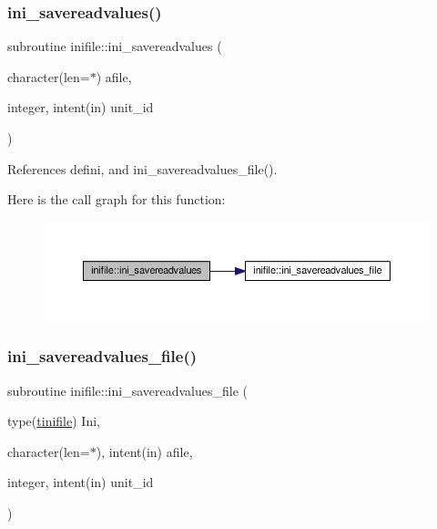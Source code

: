 \subsubsection{\texorpdfstring{ini\+\_\+savereadvalues()}{ini\_savereadvalues()}}
{\footnotesize\ttfamily subroutine inifile\+::ini\+\_\+savereadvalues (\begin{DoxyParamCaption}\item[{character(len=$\ast$)}]{afile,  }\item[{integer, intent(in)}]{unit\+\_\+id }\end{DoxyParamCaption})}



References defini, and ini\+\_\+savereadvalues\+\_\+file().

Here is the call graph for this function\+:
\nopagebreak
\begin{figure}[H]
\begin{center}
\leavevmode
\includegraphics[width=350pt]{namespaceinifile_a49bf986c5eea73c39bf9c4168143e81b_cgraph}
\end{center}
\end{figure}
\mbox{\label{namespaceinifile_a2e53433c13f03131abc980a06455e53b}} 
\subsubsection{\texorpdfstring{ini\+\_\+savereadvalues\+\_\+file()}{ini\_savereadvalues\_file()}}
{\footnotesize\ttfamily subroutine inifile\+::ini\+\_\+savereadvalues\+\_\+file (\begin{DoxyParamCaption}\item[{type(\mbox{\hyperlink{structinifile_1_1tinifile}{tinifile}})}]{Ini,  }\item[{character(len=$\ast$), intent(in)}]{afile,  }\item[{integer, intent(in)}]{unit\+\_\+id }\end{DoxyParamCaption})}



